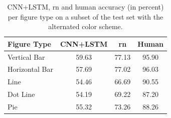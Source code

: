 \documentclass{article} %
\begin{document}
\begin{table}[h]
    \caption{CNN+LSTM, \gls{rn} and human accuracy (in percent) per figure type on a subset of the test set with the alternated color scheme.}
    \label{tab:fig-type}
    \begin{center}
        \begin{tabular}{lccc}
            \toprule
            Figure Type & CNN+LSTM & \gls{rn} & Human \\
            \midrule
            Vertical Bar & 59.63 & 77.13 %
            & 95.90 \\
            Horizontal Bar & 57.69 & 77.02 %
            & 96.03 \\
            Line & 54.46 & 66.69 %
            & 90.55 \\
            Dot Line & 54.19 & 69.22 %
            & 87.20 \\
            Pie & 55.32 & 73.26 %
            & 88.26 \\
            \bottomrule
        \end{tabular}
    \end{center}
\end{table}
\end{document}
